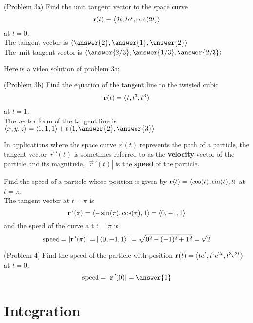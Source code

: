 \documentclass[handout]{ximera}
\begin{document}
\begin{problem}(Problem 3a)
Find the unit tangent vector to the space curve
\[
\mathbf r(t) = \left\langle 2t, te^t, \tan(2t)\right\rangle
\]
at $t = 0$.\\
The tangent vector is $\vector{\answer{2}, \answer{1}, \answer{2}}$\\
The unit tangent vector is $\vector{\answer{2/3}, \answer{1/3}, \answer{2/3}}$
\end{problem}

Here is a video solution of problem 3a:\\
\begin{foldable}
\end{foldable}

\begin{problem}(Problem 3b)
Find the equation of the tangent line to the twisted cubic
\[
\mathbf r(t) = \left\langle t, t^2, t^3\right\rangle
\]
at $t = 1$.\\
The vector form of the tangent line is $\vector{x, y, z} = \vector{1,1,1} + t\vector{1, \answer{2}, \answer{3}}$\\
\end{problem}

In applications where the space curve $\vec r(t)$ represents the path of a particle, the tangent vector $\vec r\,'(t)$ is sometimes referred to as the \textbf{velocity} vector
of the particle and its magnitude, $|\vec r\,'(t)|$ is the \textbf{speed} of the particle.

\begin{example}[Example 4]
Find the speed of a particle whose position is given by $\mathbf r(t) = \left\langle \cos(t), \sin(t), t\right\rangle$ at $t = \pi$.\\
The tangent vector at $ t = \pi$ is
\[
\mathbf r\,'(\pi) = \left\langle -\sin(\pi), \cos(\pi), 1\right\rangle = \left\langle 0, -1, 1\right\rangle
\]
and the speed of the curve a t $t = \pi$ is
\[
\text{speed} = |\mathbf r\,'(\pi)| =|\left\langle 0, -1, 1\right\rangle| = \sqrt{0^2 + (-1)^2 + 1^2} = \sqrt 2
\]
\end{example}

\begin{problem}(Problem 4) 
Find the speed of the particle with position $\mathbf r(t) = \left\langle te^t, t^2e^{2t}, t^3e^{3t}\right\rangle$ at $t = 0$.\\
\[
\text{speed} = |\vec r\,'(0)| = \answer{1}
\]
\end{problem}

\section{Integration}
\end{document}
